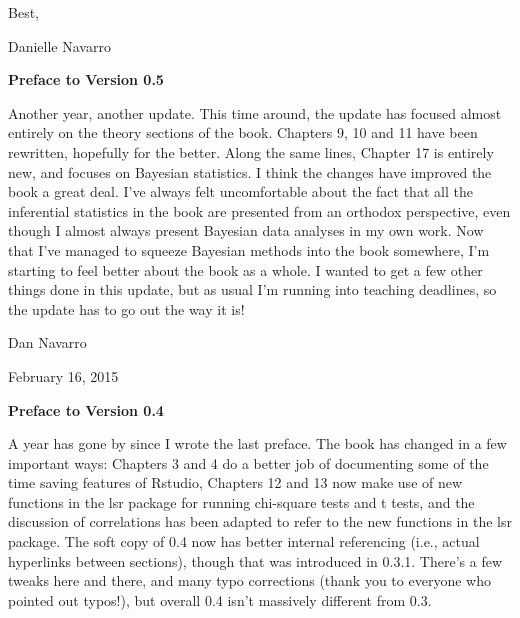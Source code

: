 \vspace*{24pt}
\noindent
Best,

\noindent
Danielle Navarro

 
\vspace*{30pt}

\begin{center}{\Large {\bf Preface to Version 0.5}}\end{center}
\vspace*{12pt}

\noindent
Another year, another update. This time around, the update has focused almost entirely on the theory sections of the book. Chapters 9, 10 and 11 have been rewritten, hopefully for the better. Along the same lines, Chapter 17 is entirely new, and focuses on Bayesian statistics. I think the changes have improved the book a great deal. I've always felt uncomfortable about the fact that all the inferential statistics in the book are presented from an orthodox perspective, even though I almost always present Bayesian data analyses in my own work. Now that I've managed to squeeze Bayesian methods into the book somewhere, I'm starting to feel better about the book as a whole. I wanted to get a few other things done in this update, but as usual I'm running into teaching deadlines, so the update has to go out the way it is!

\vspace*{24pt}
\noindent
Dan Navarro 

\noindent
February 16, 2015

\vspace*{30pt}

\begin{center}{\Large {\bf Preface to Version 0.4}}\end{center}
\vspace*{12pt}

\noindent
A year has gone by since I wrote the last preface. The book has changed in a few important ways: Chapters 3 and 4 do a better job of documenting some of the time saving features of Rstudio, Chapters 12 and 13 now make use of new functions in the lsr package for running chi-square tests and t tests, and the discussion of correlations has been adapted to refer to the new functions in the lsr package. The soft copy of 0.4 now has better internal referencing (i.e., actual hyperlinks between sections), though that was introduced in 0.3.1. There's a few tweaks here and there, and many typo corrections (thank you to everyone who pointed out typos!), but overall 0.4 isn't massively different from 0.3. 

